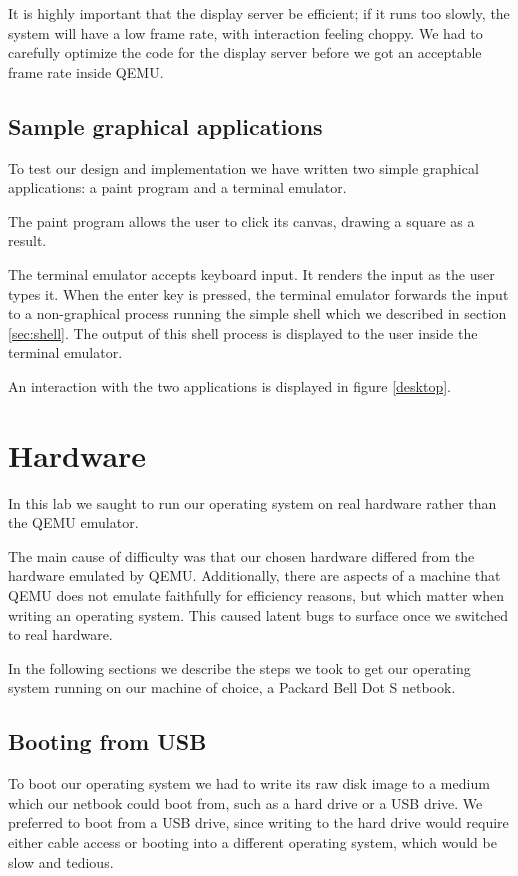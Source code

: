 \documentclass{report}
\begin{document}
It is highly important that the display server be efficient; if it runs too
slowly, the system will have a low frame rate, with interaction feeling
choppy. We had to carefully optimize the code for the display server before
we got an acceptable frame rate inside QEMU.



\section{Sample graphical applications}
To test our design and implementation we have written two simple graphical
applications: a paint program and a terminal emulator. 

The paint program allows the user to click its canvas, drawing a square as a
result.

The terminal emulator accepts keyboard input. It renders the input as the user
types it. When the enter key is pressed, the terminal emulator forwards the
input to a non-graphical process running the simple shell which we described
in section \ref{sec:shell}. The output of this shell process is displayed to
the user inside the terminal emulator.

An interaction with the two applications is displayed in figure \ref{desktop}.








\chapter{Hardware}
In this lab we saught to run our operating system on real hardware rather than
the QEMU emulator.

The main cause of difficulty was that our chosen hardware differed from the
hardware emulated by QEMU. Additionally, there are aspects of a machine that
QEMU does not emulate faithfully for efficiency reasons, but which matter when
writing an operating system. This caused latent bugs to surface once we
switched to real hardware.

In the following sections we describe the steps we took to get our operating
system running on our machine of choice, a Packard Bell Dot S netbook.


\section{Booting from USB}
To boot our operating system we had to write its raw disk image to a medium
which our netbook could boot from, such as a hard drive or a USB drive. We
preferred to boot from a USB drive, since writing to the hard drive would
require either cable access or booting into a different operating system,
which would be slow and tedious.
\end{document}
